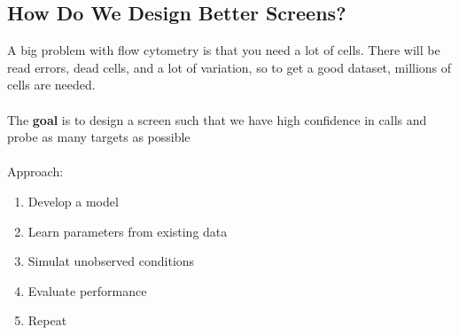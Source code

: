 \documentclass[10pt]{article}
\begin{document}
\subsection*{How Do We Design Better Screens?}
A big problem with flow cytometry is that you need a lot of cells.  There will be read errors, dead cells, and a lot of variation, so to get a good dataset, millions of cells are needed.\\\\
The \textbf{goal} is to design a screen such that we have high confidence in calls and probe as many targets as possible\\\\
Approach:
\begin{enumerate}
    \item Develop a model
    \item Learn parameters from existing data
    \item Simulat unobserved conditions
    \item Evaluate performance
    \item Repeat
\end{enumerate}
\end{document}
